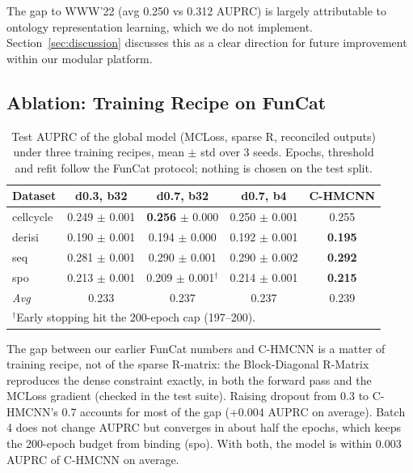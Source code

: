\documentclass[11pt,a4paper]{article}
\begin{document}
The gap to WWW'22 (avg 0.250 vs 0.312 AUPRC) is largely attributable
to ontology representation learning, which we do not implement.
Section~\ref{sec:discussion} discusses this as a clear direction for
future improvement within our modular platform.

\subsection{Ablation: Training Recipe on FunCat}
\label{sec:recipe}

\begin{table}[h]
\centering
\caption{Test AUPRC of the global model (MCLoss, sparse R, reconciled
outputs) under three training recipes, mean $\pm$ std over 3 seeds.
Epochs, threshold and refit follow the FunCat protocol; nothing is
chosen on the test split.}
\label{tab:recipe}
\begin{tabular}{lcccc}
\toprule
\textbf{Dataset} & \textbf{d0.3, b32} & \textbf{d0.7, b32} &
\textbf{d0.7, b4} & \textbf{C-HMCNN} \\
\midrule
cellcycle & 0.249 $\pm$ 0.001 & \textbf{0.256} $\pm$ 0.000 & 0.250 $\pm$ 0.001 & 0.255 \\
derisi    & 0.190 $\pm$ 0.001 & 0.194 $\pm$ 0.000 & 0.192 $\pm$ 0.001 & \textbf{0.195} \\
seq       & 0.281 $\pm$ 0.001 & 0.290 $\pm$ 0.001 & 0.290 $\pm$ 0.002 & \textbf{0.292} \\
spo       & 0.213 $\pm$ 0.001 & 0.209 $\pm$ 0.001$^\dagger$ & 0.214 $\pm$ 0.001 & \textbf{0.215} \\
\midrule
\textit{Avg} & 0.233 & 0.237 & 0.237 & 0.239 \\
\bottomrule
\multicolumn{5}{l}{\small $^\dagger$Early stopping hit the 200-epoch cap (197--200).} \\
\end{tabular}
\end{table}

The gap between our earlier FunCat numbers and C-HMCNN is a matter of
training recipe, not of the sparse R-matrix: the Block-Diagonal
R-Matrix reproduces the dense constraint exactly, in both the forward
pass and the MCLoss gradient (checked in the test suite).  Raising
dropout from 0.3 to C-HMCNN's 0.7 accounts for most of the gap
(+0.004 AUPRC on average).  Batch 4 does not change AUPRC but
converges in about half the epochs, which keeps the 200-epoch budget
from binding (spo).  With both, the model is within 0.003 AUPRC of
C-HMCNN on average.
\end{document}
